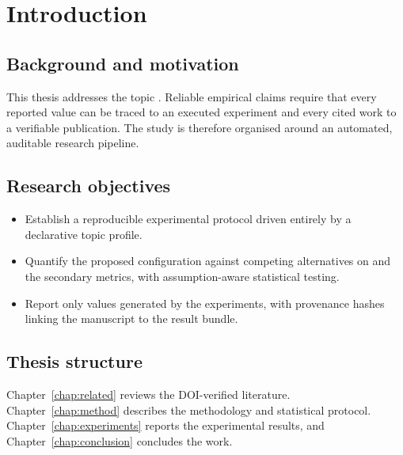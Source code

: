 \chapter{Introduction}
\label{chap:intro}

\section{Background and motivation}
This thesis addresses the topic \emph{\ThesisTitle}. Reliable empirical claims require that every
reported value can be traced to an executed experiment and every cited work to a verifiable
publication. The study is therefore organised around an automated, auditable research pipeline.

\section{Research objectives}
\begin{itemize}
  \item Establish a reproducible experimental protocol driven entirely by a declarative topic profile.
  \item Quantify the proposed configuration against competing alternatives on \MetricPrimaryName{}
        and the secondary metrics, with assumption-aware statistical testing.
  \item Report only values generated by the experiments, with provenance hashes linking the
        manuscript to the result bundle.
\end{itemize}

\section{Thesis structure}
Chapter~\ref{chap:related} reviews the DOI-verified literature. Chapter~\ref{chap:method} describes
the methodology and statistical protocol. Chapter~\ref{chap:experiments} reports the experimental
results, and Chapter~\ref{chap:conclusion} concludes the work.
